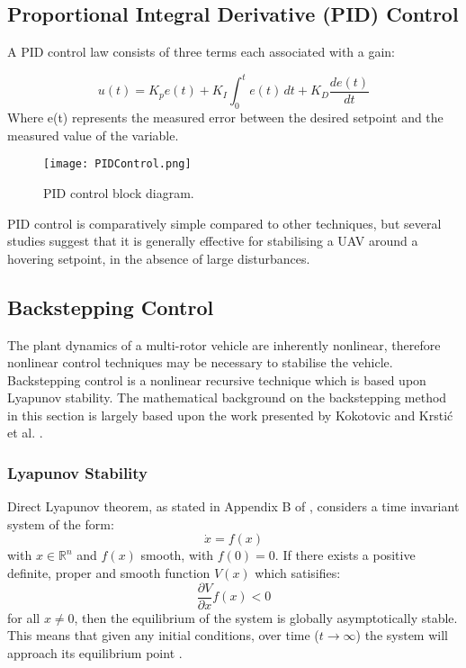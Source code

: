 \subsection{Proportional Integral Derivative (PID) Control}\label{section:PIDBackground}
A PID control law consists of three terms each associated with a gain:

\[u(t)=K_{p}e(t)+K_{I}\int_{0}^{t}e(t)\,dt+K_{D}\frac{de(t)}{dt}\]
Where e(t) represents the measured error between the desired setpoint and the measured value of the variable. 

\begin{figure}[htb]
	\texttt{[image: PIDControl.png]}%
	\caption{PID control block diagram.}%
	\label{fig:PIDControl}%
\end{figure}

PID control is comparatively simple compared to other techniques, but several studies suggest that it is generally effective for stabilising a UAV around a hovering setpoint, in the absence of large disturbances\cite{Bouabdallah2006}\cite{Pounds2010}\cite{Moussid2015}. \\

\subsection{Backstepping Control}\label{section:BacksteppingBackground}
The plant dynamics of a multi-rotor vehicle are inherently nonlinear, therefore nonlinear control techniques may be necessary to stabilise the vehicle. Backstepping control is a nonlinear recursive technique which is based upon Lyapunov stability. The mathematical background on the backstepping method in this section is largely based upon the work presented by Kokotovic \cite{1992a} and Krsti\'c et al. \cite{Krstic1995}.

\subsubsection{Lyapunov Stability}
Direct Lyapunov theorem, as stated in Appendix B of \cite{Isidori1995}, considers a time invariant system of the form:
\[\dot{x}=f(x)\]
with $x\in\mathbb{R}^{n}$ and $f(x)$ smooth, with $f(0)=0$. If there exists a positive definite, proper and smooth function $V(x)$ which satisifies:
\[\frac{\partial V}{\partial x}f(x)<0\]
for all $x\neq0$, then the equilibrium of the system is globally asymptotically stable. This means that given any initial conditions, over time ($t\rightarrow\infty$) the system will approach its equilibrium point \cite{Chen1999}. 

